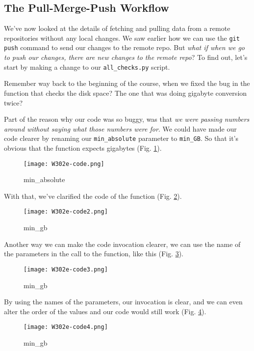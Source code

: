 \subsection{The Pull-Merge-Push Workflow} \label{W303a}

We've now looked at the details of fetching and pulling data from a remote repositories without any local changes. We saw earlier how we can use the \verb|git push| command to send our changes to the remote repo. But \textit{what if when we go to push our changes, there are new changes to the remote repo}? To find out, let's start by making a change to our \verb|all_checks.py| script.

Remember way back to the beginning of the course, when we fixed the bug in the function that checks the disk space? The one that was doing gigabyte conversion twice?

Part of the reason why our code was so buggy, was that \textit{we were passing numbers around without saying what those numbers were for}. We could have made our code clearer by renaming our \verb|min_absolute| parameter to \verb|min_GB|. So that it's obvious that the function expects gigabytes (Fig. \ref{W302e-code}).

\begin{figure} 
	\caption{min\_absolute}
	\centering
	\texttt{[image: W302e-code.png]}
	\label{W302e-code}
\end{figure}

With that, we've clarified the code of the function (Fig. \ref{W302e-code2}). 

\begin{figure} 
	\caption{min\_gb}
	\centering
	\texttt{[image: W302e-code2.png]}
	\label{W302e-code2}
\end{figure}

Another way we can make the code invocation clearer, we can use the name of the parameters in the call to the function, like this (Fig. \ref{W302e-code3}).

\begin{figure} 
	\caption{min\_gb}
	\centering
	\texttt{[image: W302e-code3.png]}
	\label{W302e-code3}
\end{figure}

By using the names of the parameters, our invocation is clear, and we can even alter the order of the values and our code would still work (Fig. \ref{W302e-code4}).

\begin{figure} 
	\caption{min\_gb}
	\centering
	\texttt{[image: W302e-code4.png]}
	\label{W302e-code4}
\end{figure}


